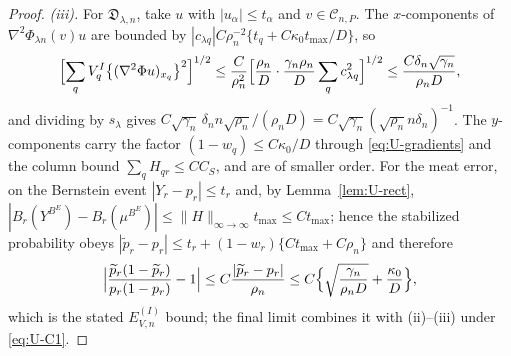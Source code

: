 \documentclass[11pt]{article}
\theoremstyle{definition}
\newcommand{\1}{\mathbf 1}\newcommand{\op}{\operatorname}
\begin{document}
\begin{proof}
\emph{(iii).}  For $\mathfrak D_{\lambda,n}$, take
$u$ with $|u_\alpha|\le t_\alpha$ and $v\in\mathcal C_{n,P}$.  The
$x$-components of $\nabla^2\Phi_{\lambda n}(v)u$ are bounded by
$|c_{\lambda q}|C\rho_n^{-2}\{t_q+C\kappa_0t_{\max}/D\}$, so
\[
\Bigl[\sum_qV^{I}_q
\bigl\{(\nabla^2\Phi u)_{x_q}\bigr\}^2\Bigr]^{1/2}
\le\frac{C}{\rho_n^2}
\Bigl[\frac{\rho_n}{D}\cdot\frac{\gamma_n\rho_n}{D}
\sum_qc_{\lambda q}^2\Bigr]^{1/2}
\le\frac{C\delta_n\sqrt{\gamma_n}}{\rho_nD},
\]
and dividing by $s_\lambda$ gives
$C\sqrt{\gamma_n}\,\delta_n n\sqrt{\rho_n}/(\rho_nD)
=C\sqrt{\gamma_n}(\sqrt{\rho_n}n\delta_n)^{-1}$.  The $y$-components carry the
factor $(1-w_q)\le C\kappa_0/D$ through \eqref{eq:U-gradients} and the column
bound $\sum_qH_{qr}\le CC_S$, and are of smaller order.  For the meat error,
on the Bernstein event $|Y_r-p_r|\le t_r$ and, by Lemma~\ref{lem:U-rect},
$|B_r(Y^{B^E})-B_r(\mu^{B^E})|\le\|H\|_{\infty\to\infty}t_{\max}\le Ct_{\max}$;
hence the stabilized probability obeys
$|\widetilde p_r-p_r|\le t_r+(1-w_r)\{Ct_{\max}+C\rho_n\}$ and therefore
\[
\Bigl|\frac{\widetilde p_r(1-\widetilde p_r)}{p_r(1-p_r)}-1\Bigr|
\le C\frac{|\widetilde p_r-p_r|}{\rho_n}
\le C\Bigl\{\sqrt{\frac{\gamma_n}{\rho_nD}}+\frac{\kappa_0}{D}\Bigr\},
\]
which is the stated $E^{(I)}_{V,n}$ bound; the final limit combines it with
(ii)--(iii) under \eqref{eq:U-C1}.


\end{proof}
\end{document}
